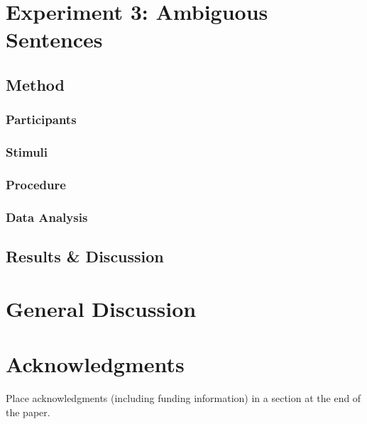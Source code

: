 \documentclass[10pt,letterpaper]{article}
\begin{document}
\section{Experiment 3: Ambiguous Sentences}

\subsection{Method} 

\subsubsection{Participants} \quad

\subsubsection{Stimuli} \quad

\subsubsection{Procedure} \quad

\subsubsection{Data Analysis} \quad

\subsection{Results \& Discussion}


\section{General Discussion}


\section{Acknowledgments}

Place acknowledgments (including funding information) in a section at
the end of the paper.



\setlength{\bibleftmargin}{.125in}
\setlength{\bibindent}{-\bibleftmargin}


\end{document}
